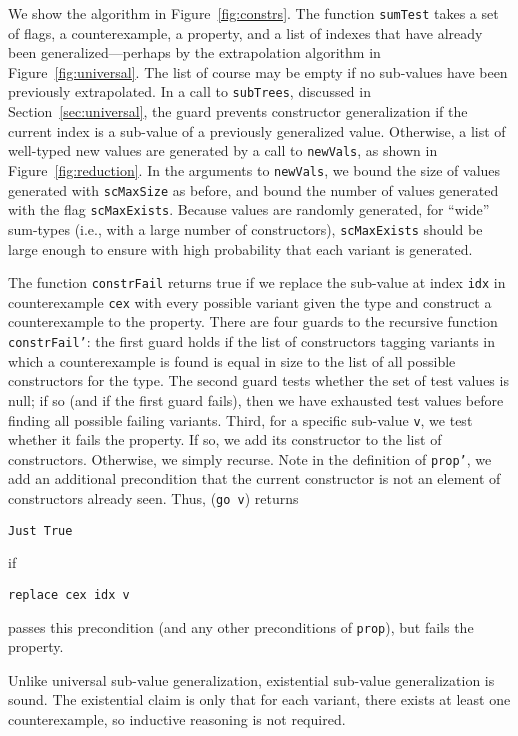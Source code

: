 \documentclass{sigplanconf}
\newenvironment{code}{\begin{alltt}\footnotesize}{\end{alltt}}
\newcommand{\ttp}[1]{\texttt{#1}}
\begin{document}
We show the algorithm in Figure~\ref{fig:constrs}.  The function \ttp{sumTest}
takes a set of flags, a counterexample, a property, and a list of indexes that
have already been generalized---perhaps by the extrapolation algorithm in
Figure~\ref{fig:universal}.  The list of course may be empty if no sub-values
have been previously extrapolated.  In a call to \ttp{subTrees}, discussed in
Section~\ref{sec:universal}, the guard prevents constructor generalization if
the current index is a sub-value of a previously generalized value.  Otherwise,
a list of well-typed new values are generated by a call to \ttp{newVals}, as
shown in Figure~\ref{fig:reduction}.  In the arguments to \ttp{newVals}, we
bound the size of values generated with \ttp{scMaxSize} as before, and bound the
number of values generated with the flag \ttp{scMaxExists}.  Because values are
randomly generated, for ``wide'' sum-types (i.e., with a large number of
constructors), \ttp{scMaxExists} should be large enough to ensure with high
probability that each variant is generated.

The function \ttp{constrFail} returns true if we replace the sub-value at index
\ttp{idx} in counterexample \ttp{cex} with every possible variant given the type
and construct a counterexample to the property.  There are four guards to the
recursive function \ttp{constrFail'}: the first guard holds if the list of
constructors tagging variants in which a counterexample is found is equal in
size to the list of all possible constructors for the type.  The second guard
tests whether the set of test values is null; if so (and if the first guard
fails), then we have exhausted test values before finding all possible failing
variants.  Third, for a specific sub-value \ttp{v}, we test whether it fails the
property.  If so, we add its constructor to the list of constructors.
Otherwise, we simply recurse.  Note in the definition of \ttp{prop'}, we add an
additional precondition that the current constructor is not an element of
constructors already seen.  Thus, (\ttp{go v}) returns
%
\begin{code}
\ttp{Just True}
\end{code}
%
\noindent
if
%
\begin{code}
\ttp{replace cex idx v}
\end{code}
%
passes this precondition (and any other preconditions of \ttp{prop}), but fails
the property.

Unlike universal sub-value generalization, existential sub-value generalization
is sound.  The existential claim is only that for each variant, there exists at
least one counterexample, so inductive reasoning is not required.
\end{document}
